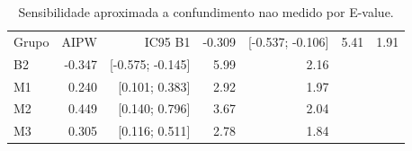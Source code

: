 \begin{table}[htbp]
\centering
\small
\caption{Sensibilidade aproximada a confundimento nao medido por E-value.}
\label{tab:evalues}
\begin{tabular}{lrrrr}
\toprule
Grupo & AIPW & IC95%
\midrule
B1 & -0.309 & [-0.537; -0.106] & 5.41 & 1.91 \\
B2 & -0.347 & [-0.575; -0.145] & 5.99 & 2.16 \\
M1 & 0.240 & [0.101; 0.383] & 2.92 & 1.97 \\
M2 & 0.449 & [0.140; 0.796] & 3.67 & 2.04 \\
M3 & 0.305 & [0.116; 0.511] & 2.78 & 1.84 \\
\bottomrule
\end{tabular}
\end{table}

